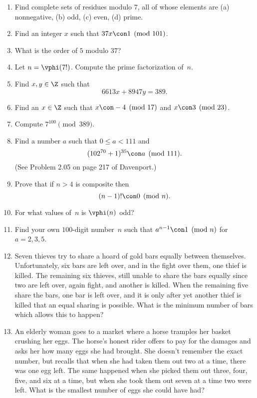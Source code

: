 \documentclass[11pt]{report}
\begin{document}
\begin{enumerate}
  \item Find complete sets of residues modulo $7$, all of whose elements
        are (a) nonnegative, (b) odd, (c) even, (d) prime.

  \item Find an integer $x$ such that $37x \con 1\pmod{101}$.

  \item What is the order of $5$ modulo $37$?

  \item Let $n=\vphi(7!)$.  Compute the prime factorization of~$n$.

  \item Find $x, y\in\Z$ such that
        $$
          6613x + 8947y = 389.
        $$

  \item Find an $x\in\Z$ such that
        $x \con -4 \pmod{17}$ and $x\con 3\pmod{23}$.

  \item Compute
        $7^{100}\pmod{389}$.

  \item Find a number $a$ such that $0\leq a < 111$ and
        $$
          (102^{70}+1)^{35} \con a\pmod{111}.
        $$
        (See Problem 2.05 on page 217 of Davenport.)


  \item Prove that if $n>4$ is composite then
        $$
          (n-1)! \con 0 \pmod{n}.
        $$

  \item For what values of~$n$ is $\vphi(n)$ odd?

  \item Find your own $100$-digit number~$n$ such that
        $
          a^{n-1}\con 1\pmod{n}
        $
        for $a=2,3,5$.

  \item Seven thieves try to share a hoard of gold bars equally between
        themselves.  Unfortunately, six bars are left over, and in the fight
        over them, one thief is killed.  The remaining six thieves, still
        unable to share the bars equally since two are left over, again fight,
        and another is killed.  When the remaining five share the bars, one
        bar is left over, and it is only after yet another thief is killed
        that an equal sharing is possible.  What is the minimum number of bars
        which allows this to happen?

  \item
        An elderly woman goes to a market where a horse tramples her basket
        crushing her eggs. The horse's honest rider offers to pay for the
        damages and asks her how many eggs she had brought. She doesn't
        remember the exact number, but recalls that when she had taken them
        out two at a time, there was one egg left. The same happened when she
        picked them out three, four, five, and six at a time, but when she
        took them out seven at a time two were left. What is the smallest
        number of eggs she could have had?

\end{enumerate}
\end{document}
